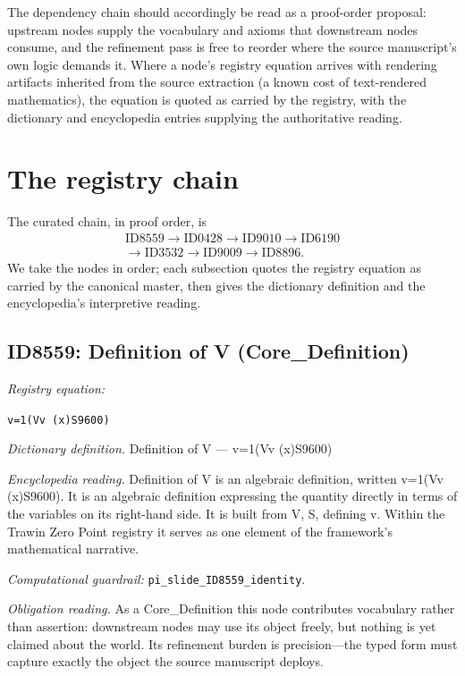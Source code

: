 \documentclass[11pt]{article}
\theoremstyle{remark}
\begin{document}
The dependency chain should accordingly be read as a proof-order proposal: upstream nodes supply the vocabulary and axioms that downstream nodes consume, and the refinement pass is free to reorder where the source manuscript's own logic demands it. Where a node's registry equation arrives with rendering artifacts inherited from the source extraction (a known cost of text-rendered mathematics), the equation is quoted as carried by the registry, with the dictionary and encyclopedia entries supplying the authoritative reading.

\section{The registry chain}
\label{sec:chain}

The curated chain, in proof order, is
\begin{equation*}
\begin{gathered}
\text{ID8559} \to \text{ID0428} \to \text{ID9010} \to \text{ID6190} \\
\to \text{ID3532} \to \text{ID9009} \to \text{ID8896}.
\end{gathered}
\end{equation*}
We take the nodes in order; each subsection quotes the registry equation as carried by the canonical master, then gives the dictionary definition and the encyclopedia's interpretive reading.

\subsection{ID8559: Definition of V (Core\_Definition)}

\noindent\textit{Registry equation:}\par
{\small\texttt{v=1(Vv (x)S9600)}}\par\medskip
\noindent\textit{Dictionary definition.} Definition of V --- v=1(Vv (x)S9600)\par\medskip
\noindent\textit{Encyclopedia reading.} Definition of V is an algebraic definition, written v=1(Vv (x)S9600). It is an algebraic definition expressing the quantity directly in terms of the variables on its right-hand side. It is built from V, S, defining v. Within the Trawin Zero Point registry it serves as one element of the framework's mathematical narrative.
\par\medskip\noindent\textit{Computational guardrail:} \texttt{pi\_slide\_ID8559\_identity}.
\par\medskip\noindent\textit{Obligation reading.} As a Core\_Definition this node contributes vocabulary rather than assertion: downstream nodes may use its object freely, but nothing is yet claimed about the world. Its refinement burden is precision---the typed form must capture exactly the object the source manuscript deploys.
\end{document}
